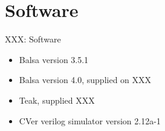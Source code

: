 \section{Software}

XXX: Software

\begin{itemize}
  \item Balsa version 3.5.1
  \item Balsa version 4.0, supplied on XXX
  \item Teak, supplied XXX
  \item CVer verilog simulator version 2.12a-1 
\end{itemize}
